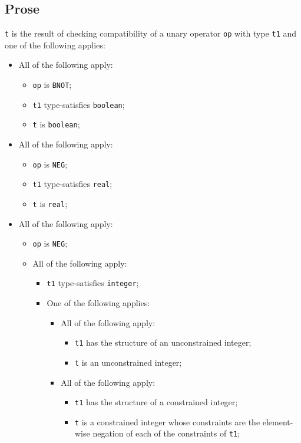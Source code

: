 \documentclass{book}
\begin{document}
\subsection{Prose}
  \texttt{t} is the result of checking compatibility of a unary operator \texttt{op} with
  type \texttt{t1} and one of the following applies:
  \begin{itemize}
  \item All of the following apply:
    \begin{itemize}
      \item \texttt{op} is \texttt{BNOT};
      \item \texttt{t1} type-satisfies \texttt{boolean};
      \item \texttt{t} is \texttt{boolean};
    \end{itemize}

  \item All of the following apply:
  \begin{itemize}
    \item \texttt{op} is \texttt{NEG};
    \item \texttt{t1} type-satisfies \texttt{real};
    \item \texttt{t} is \texttt{real};
  \end{itemize}

  \item All of the following apply:
    \begin{itemize}
    \item \texttt{op} is \texttt{NEG};
    \item All of the following apply:
    \begin{itemize}
      \item \texttt{t1} type-satisfies \texttt{integer}; 
      \item One of the following applies:
        \begin{itemize}
          \item All of the following apply:
           \begin{itemize}
             \item \texttt{t1} has the structure of an unconstrained integer;
             \item \texttt{t} is an unconstrained integer;
           \end{itemize}
           \item All of the following apply:
           \begin{itemize}
             \item \texttt{t1} has the structure of a constrained integer;
             \item \texttt{t} is a constrained integer whose constraints are the element-wise negation of each of the constraints of \texttt{t1};
           \end{itemize}
        \end{itemize}
    \end{itemize}  
  \end{itemize}


\end{itemize}
\end{document}

